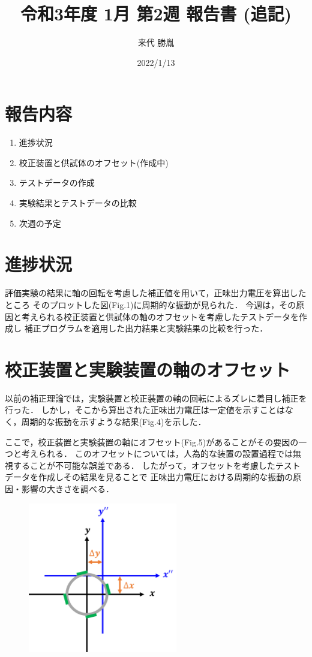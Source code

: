 \documentclass[twocolumn,a4j]{jsarticle}
\author{来代 勝胤}
\title{令和3年度 1月 第2週 報告書 (追記)}
\date{2022/1/13}
\begin{document}
\columnseprule=0.1mm

\maketitle
\section*{報告内容}
\begin{enumerate}[1.]
    \item 進捗状況
    \item 校正装置と供試体のオフセット(作成中)
    \item テストデータの作成
    \item 実験結果とテストデータの比較
    \item 次週の予定
\end{enumerate}

\section{進捗状況}
評価実験の結果に軸の回転を考慮した補正値を用いて，正味出力電圧を算出したところ
そのプロットした図(Fig.1)に周期的な振動が見られた．
今週は，その原因と考えられる校正装置と供試体の軸のオフセットを考慮したテストデータを作成し
補正プログラムを適用した出力結果と実験結果の比較を行った．

\section{校正装置と実験装置の軸のオフセット}

以前の補正理論では，実験装置と校正装置の軸の回転によるズレに着目し補正を行った．
しかし，そこから算出された正味出力電圧は一定値を示すことはなく，周期的な振動を示すような結果(Fig.4)を示した．\par
ここで，校正装置と実験装置の軸にオフセット(Fig.5)があることがその要因の一つと考えられる．
このオフセットについては，人為的な装置の設置過程では無視することが不可能な誤差である．
したがって，オフセットを考慮したテストデータを作成しその結果を見ることで
正味出力電圧における周期的な振動の原因・影響の大きさを調べる．

\begin{figure}[htbp]
    \footnotesize
    \begin{center}
        \includegraphics[width=65mm]{../images/image_5.png}
        \caption{}
    \end{center}
\end{figure}
\end{document}
